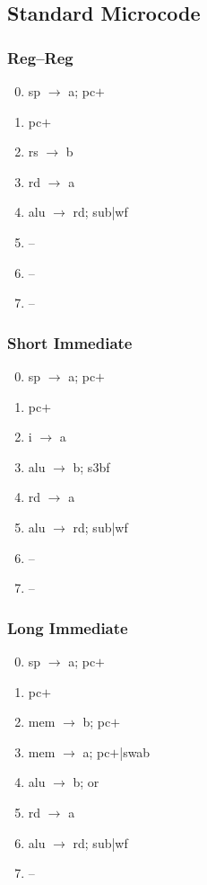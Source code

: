 \documentclass[11pt]{book}
\begin{document}
\subsection*{Standard Microcode}
\begin{multicols}{3}\ttfamily\selectfont\small
  \subsubsection*{Reg--Reg}
  \begin{enumerate}\setcounter{enumi}{-1}
  \item sp \(\rightarrow\) a; pc\(+\)
  \item pc\(+\)
  \item rs \(\rightarrow\) b
  \item rd \(\rightarrow\) a
  \item alu \(\rightarrow\) rd; sub|wf
  \item --
  \item --
  \item --
  \end{enumerate}
  \columnbreak
  \subsubsection*{Short Immediate}
  \begin{enumerate}\setcounter{enumi}{-1}
  \item sp \(\rightarrow\) a; pc\(+\)
  \item pc\(+\)
  \item i \(\rightarrow\) a
  \item alu \(\rightarrow\) b; s3bf
  \item rd \(\rightarrow\) a
  \item alu \(\rightarrow\) rd; sub|wf
  \item --
  \item --
  \end{enumerate}
  \columnbreak
  \subsubsection*{Long Immediate}
  \begin{enumerate}\setcounter{enumi}{-1}
  \item sp \(\rightarrow\) a; pc\(+\)
  \item pc\(+\)
  \item mem \(\rightarrow\) b; pc\(+\)
  \item mem \(\rightarrow\) a; pc\(+\)|swab
  \item alu \(\rightarrow\) b; or
  \item rd \(\rightarrow\) a
  \item alu \(\rightarrow\) rd; sub|wf
  \item --
  \end{enumerate}
\end{multicols}
\end{document}
